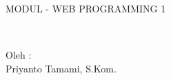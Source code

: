 \begin{titlepage}

\begin{center}
{\large MODUL - WEB PROGRAMMING 1}

\HRule\\[1cm]



\vfill

Oleh :\\
Priyanto Tamami, S.Kom.

\vfill

\end{center}

\end{titlepage}
